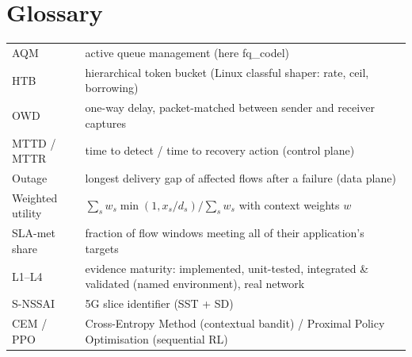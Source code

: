 \section{Glossary}
{\small
\begin{tabularx}{\linewidth}{@{}lX@{}}
AQM & active queue management (here fq\_codel)\\
HTB & hierarchical token bucket (Linux classful shaper: rate, ceil, borrowing)\\
OWD & one-way delay, packet-matched between sender and receiver captures\\
MTTD / MTTR & time to detect / time to recovery action (control plane)\\
Outage & longest delivery gap of affected flows after a failure (data plane)\\
Weighted utility & $\sum_s w_s\min(1,x_s/d_s)/\sum_s w_s$ with context weights $w$\\
SLA-met share & fraction of flow windows meeting all of their application's targets\\
L1--L4 & evidence maturity: implemented, unit-tested, integrated \& validated (named environment), real network\\
S-NSSAI & 5G slice identifier (SST + SD)\\
CEM / PPO & Cross-Entropy Method (contextual bandit) / Proximal Policy Optimisation (sequential RL)\\
\end{tabularx}}
